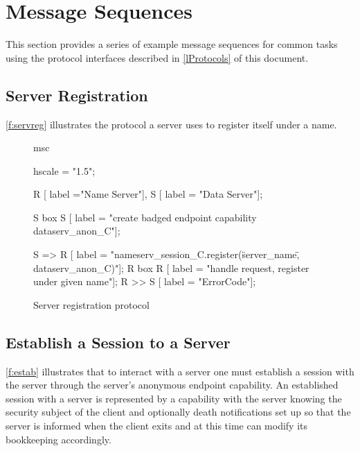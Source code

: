%
%
%
%

\section{Message Sequences}

This section provides a series of example message sequences for common tasks using the protocol interfaces described in \autoref{lProtocols} of this document.

\subsection{Server Registration}

\autoref{f:servreg} illustrates the protocol a server uses to register itself under a name.

\begin{figure}[htb]
\begin{center}
\begin{msc}
msc {
    hscale = "1.5";

    R [ label ="Name Server"],
    S [ label = "Data Server"];
    
    S box S [ label = "create badged endpoint capability dataserv\_anon\_C"];
 
    S => R [ label = "nameserv\_session\_C.register(\"server\_name\", dataserv\_anon\_C)"];
    R box R [ label = "handle request, register under given name"];
    R >> S [ label = "ErrorCode"];
}
\end{msc}
\end{center}
\caption{Server registration protocol}
\label{f:servreg}
\end{figure}

\subsection{Establish a Session to a Server}


\autoref{f:estab} illustrates that to interact with a server one must establish a session with the server through the server's anonymous endpoint capability. An established session with a server is represented by a  capability with the server knowing the security subject of the client and optionally death notifications set up so that the server is informed when the client exits and at this time can modify its bookkeeping accordingly.

